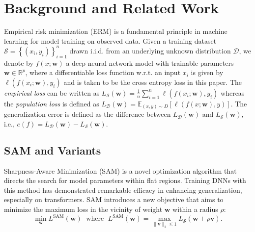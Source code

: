 \documentclass[letterpaper]{article} %
\theoremstyle{plain}
\theoremstyle{definition}
\newcommand{\blue}[1]{\textcolor{blue}{[#1]}}
\newcommand{\teal}[1]{\textcolor{teal}{#1}}
\begin{document}
\section{Background and Related Work}
\label{sec:Background}

Empirical risk minimization (ERM) is a fundamental principle in machine learning for model training on observed data.  Given a training dataset $\mathcal{S} = \left\{\left(x_i, y_i\right)\right\}_{i=1}^n$ drawn i.i.d. from an underlying unknown distribution $\mathcal{D}$, we denote by $f(x ; \boldsymbol{w})$ a deep neural network model with trainable parameters $\boldsymbol{w} \in \mathbb{R}^p$, where a differentiable loss function w.r.t. an input $x_i$ is given by $\ell\left(f\left(x_i ; \boldsymbol{w}\right), y_i\right)$ and is taken to be the cross entropy loss in this paper. %
The \emph{empirical loss} can be written as $L_{\mathcal{S}}(\boldsymbol{w}) = \frac{1}{n}\sum_{i=1}^n \ell\left(f\left(x_i ; \boldsymbol{w}\right), y_i\right)$ whereas the \emph{population loss} is defined as $L_{\mathcal{D}}(\boldsymbol{w}) = \mathbb{E}_{(x, y) \sim D}[\ell\left(f\left(x ; \boldsymbol{w}\right), y\right)]$. The generalization error is defined as the difference between $L_{\mathcal{D}}(\boldsymbol{w})$ and $L_{\mathcal{S}}(\boldsymbol{w})$, i.e., $e(f)=L_{\mathcal{D}}(\boldsymbol{w})-L_{\mathcal{S}}(\boldsymbol{w})$.

\subsection{SAM and Variants}
\label{subsec:sam}
Sharpness-Aware Minimization (SAM) \cite{foret2021sharpnessaware} is a novel optimization algorithm that directs the search for model parameters within flat regions. Training DNNs with this method has demonstrated remarkable efficacy in enhancing generalization, especially on transformers. SAM introduces a new objective that aims to minimize the maximum loss in the vicinity of weight $\boldsymbol{w}$ within a radius $\rho$:
\begin{equation*}
\min _{\boldsymbol{w}} L^{\operatorname{SAM}}(\boldsymbol{w})\; \text { where }\; L^{\operatorname{SAM}}(\boldsymbol{w}) = \max _{\|\boldsymbol{v}\|_2 \leq 1} L_{\mathcal{S}}(\boldsymbol{w}+\rho \boldsymbol{v}).
\end{equation*}
\end{document}
